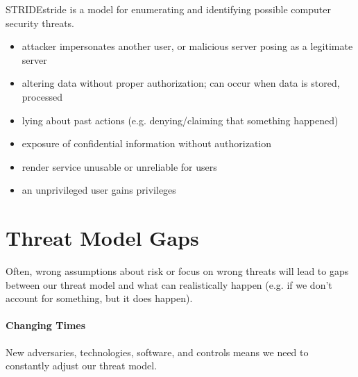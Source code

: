 \begin{dfnbox}{STRIDE}{stride}
     is a model for enumerating and identifying possible computer security threats.
    \begin{itemize}[noitemsep]
        \item {} attacker impersonates another user, or malicious server posing as a legitimate server
        \item {} altering data without proper authorization; can occur when data is stored, processed
        \item {} lying about past actions (e.g. denying/claiming that something happened)
        \item {} exposure of confidential information without authorization
        \item {} render service unusable or unreliable for users
        \item {} an unprivileged user gains privileges
    \end{itemize}
\end{dfnbox}

\section{Threat Model Gaps}
Often, wrong assumptions about risk or focus on wrong threats will lead to gaps between our threat model and what can realistically happen (e.g. if we don't account for something, but it does happen).

\paragraph{Changing Times}
New adversaries, technologies, software, and controls means we need to constantly adjust our threat model.

